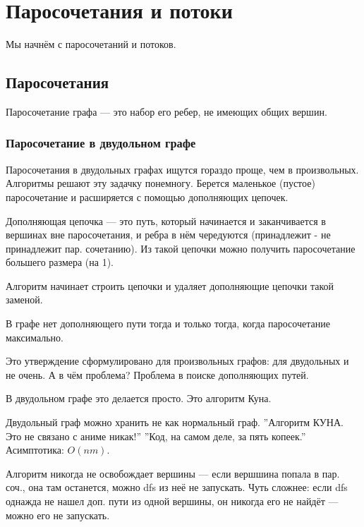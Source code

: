 \chapter{Паросочетания и потоки}

Мы начнём с паросочетаний и потоков.

\section{Паросочетания}
Паросочетание графа --- это набор его ребер, не имеющих общих вершин.

\subsection{Паросочетание в двудольном графе}
Паросочетания в двудольных графах ищутся гораздо проще, чем в произвольных.
Алгоритмы решают эту задачку понемногу. 
Берется маленькое (пустое) паросочетание и расширяется с помощью дополняющих цепочек.

Дополняющая цепочка --- это путь, который начинается и заканчивается в вершинах вне паросочетания, и ребра в нём чередуются (принадлежит - не принадлежит пар. сочетанию).
Из такой цепочки можно получить паросочетание большего размера (на 1).

Алгоритм начинает строить цепочки и удаляет дополняющие цепочки такой заменой.
\begin{theorem}
    В графе нет дополняющего пути тогда и только тогда, когда паросочетание максимально.
\end{theorem}
Это утверждение сформулировано для произвольных графов: для двудольных и не очень.
А в чём проблема? 
Проблема в поиске дополняющих путей.

В двудольном графе это делается просто. 
Это алгоритм Куна.

Двудольный граф можно хранить не как нормальный граф.
''Алгоритм КУНА. Это не связано с аниме никак!''
''Код, на самом деле, за пять копеек.''
Асимптотика: $O(nm)$.




Алгоритм никогда не освобождает вершины --- если вершшина попала в пар. соч., она там останется, можно dfs из неё не запускать.
Чуть сложнее: если dfs однажда не нашел доп. пути из одной вершины, он никогда его не найдёт --- можно его не запускать.


